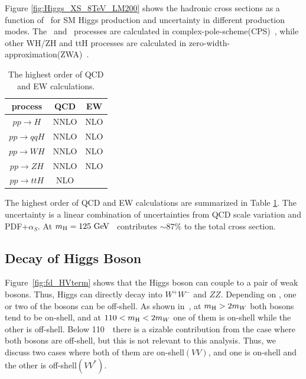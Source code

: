 Figure \ref{fig:Higgs_XS_8TeV_LM200} shows the hadronic cross sections 
as a function of \mHi\ for SM Higgs production and uncertainty 
in different production modes. 
The \ggH\ and \qqH\ processes are 
calculated in complex-pole-scheme(CPS)~\cite{Goria:2011wa}, while other WH/ZH and ttH processes 
are calculated in zero-width-approximation(ZWA)~\cite{pilkuhn1967interactions}. 
\begin{table}[htb]
\centering
\vspace{0.5cm} 
\caption{The highest order of QCD and EW calculations.}
\vspace{0.5cm} 
\begin{tabular}{c c c  }
\hline
process     & QCD   & EW \\
\hline \hline 
$ pp \rightarrow H$         & NNLO  & NLO \\
$ pp \rightarrow qqH$       & NNLO  & NLO \\
$ pp \rightarrow WH$        & NNLO  & NLO \\
$ pp \rightarrow ZH$        & NNLO  & NLO \\
$ pp \rightarrow ttH$       & NLO   &     \\
\hline 
\end{tabular}
\label{tab:Higgs_XS_8TeV_order}
\end{table}
The highest order of QCD and EW calculations are summarized in Table 
\ref{tab:Higgs_XS_8TeV_order}. The uncertainty is a linear combination 
of uncertainties from QCD scale variation and PDF+$\alpha_S$.
At $m_{\mathrm{H}}=125~\mathrm{Ge\kern -0.1em V}$ \ggH\ contributes $\sim 87 \%$ to the total cross section.



\newpage
\subsection{Decay of Higgs Boson}
\label{sec:decayHiggs}

Figure~\ref{fig:fd_HVterm} shows that the Higgs boson can 
couple to a pair of weak bosons. Thus, Higgs can directly decay into $W^+W^-$ and $ZZ$.
Depending on \mHi, one or two of the bosons can be off-shell. 
As shown in~\cite{Djouadi20081}, at $m_{\mathrm{H}}>2m_W$ both bosons 
tend to be on-shell, and at $110<m_{\mathrm{H}}<2m_W$ one of them is on-shell 
while the other is off-shell. Below 110~\GeV\ there is a sizable contribution 
from the case where both bosons are off-shell, but this is not relevant 
to this analysis. Thus, we discuss two cases where both of them are on-shell$(VV)$, 
and one is on-shell and the other is off-shell$(VV^*)$. 

